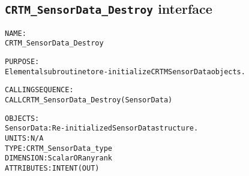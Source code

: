 \subsection{\texttt{CRTM\_SensorData\_Destroy} interface}
  \label{sec:CRTM_SensorData_Destroy_interface}
  \begin{alltt}
 
  NAME:
        CRTM_SensorData_Destroy
 
  PURPOSE:
        Elemental subroutine to re-initialize CRTM SensorData objects.
 
  CALLING SEQUENCE:
        CALL CRTM_SensorData_Destroy( SensorData )
 
  OBJECTS:
        SensorData:   Re-initialized SensorData structure.
                      UNITS:      N/A
                      TYPE:       CRTM_SensorData_type
                      DIMENSION:  Scalar OR any rank
                      ATTRIBUTES: INTENT(OUT)
 
  \end{alltt}
